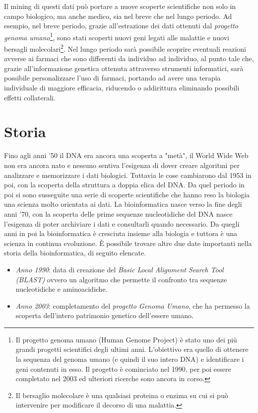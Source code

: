 Il mining di questi dati può portare a nuove scoperte scientifiche non solo in campo biologico, ma anche medico, sia nel breve che nel lungo periodo. Ad esempio, nel breve periodo, grazie all'estrazione dei dati ottenuti dal \textit{progetto genoma umano}\footnote{Il progetto genoma umano (Human Genome Project) è stato uno dei più grandi progetti scientifici degli ultimi anni. L'obiettivo era quello di ottenere la sequenza del genoma umano (e quindi il suo intero DNA) e identificare i geni contenuti in esso. Il progetto è cominciato nel 1990, per poi essere completato nel 2003 ed ulteriori ricerche sono ancora in corso.}, sono stati scoperti nuovi geni legati alle malattie e nuovi bersagli molecolari\footnote{Il bersaglio molecolare è una qualsiasi proteina o enzima su cui si può intervenire per modificare il decorso di una malattia.}. Nel lungo periodo sarà possibile scoprire eventuali reazioni avverse ai farmaci che sono differenti da individuo ad individuo, al punto tale che, grazie all'informazione genetica ottenuta attraverso strumenti informatici, sarà possibile personalizzare l'uso di farmaci, portando ad avere una terapia individuale di maggiore efficacia, riducendo o addirittura eliminando possibili effetti collaterali.


\section{Storia}
Fino agli anni '50 il DNA era ancora una scoperta a "metà", il World Wide Web non era ancora nato e nessuno sentiva l'esigenza di dover creare algoritmi per analizzare e memorizzare i dati biologici. Tuttavia le cose cambiarono dal 1953 in poi, con la scoperta della struttura a doppia elica del DNA. Da quel periodo in poi si sono susseguite una serie di scoperte scientifiche che hanno reso la biologia una scienza molto orientata ai dati.
\newline
La bioinformatica nasce verso la fine degli anni '70, con la scoperta delle prime sequenze nucleotidiche del DNA nasce l'esigenza di poter archiviare i dati e consultarli quando necessario. Da quegli anni in poi la bioinformatica è cresciuta insieme alla biologia e tuttora è una scienza in continua evoluzione.
\newline
\`E possibile trovare altre due date importanti nella storia della bioinformatica, di seguito elencate.
\begin{itemize}
	\item \textit{Anno 1990}: data di creazione del \textit{Basic Local Alignment Search Tool (BLAST)} \cite{BLAST} ovvero un algoritmo che permette il confronto tra sequenze nucleotidiche e aminoacidiche.
	\item \textit{Anno 2003}: completamento del \textit{progetto Genoma Umano}, che ha permesso la scoperta dell'intero patrimonio genetico dell'essere umano.
\end{itemize}


